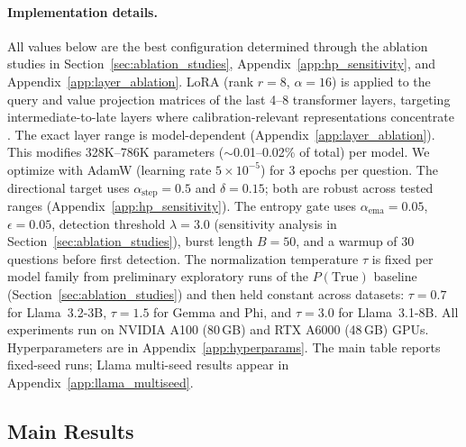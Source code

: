 \documentclass[11pt]{article}
\begin{document}
\paragraph{Implementation details.}
All values below are the best configuration determined through the ablation studies in Section~\ref{sec:ablation_studies}, Appendix~\ref{app:hp_sensitivity}, and Appendix~\ref{app:layer_ablation}.
LoRA (rank $r{=}8$, $\alpha{=}16$) is applied to the query and value projection matrices of the last 4--8 transformer layers, targeting intermediate-to-late layers where calibration-relevant representations concentrate \cite{du_haloscope_2024}. The exact layer range is model-dependent (Appendix~\ref{app:layer_ablation}). This modifies 328K--786K parameters (${\sim}$0.01--0.02\% of total) per model.
We optimize with AdamW (learning rate $5 \times 10^{-5}$) for 3 epochs per question. The directional target uses $\alpha_{\text{step}} = 0.5$ and $\delta = 0.15$; both are robust across tested ranges (Appendix~\ref{app:hp_sensitivity}).
The entropy gate uses $\alpha_{\text{ema}} = 0.05$, $\epsilon = 0.05$, detection threshold $\lambda = 3.0$ (sensitivity analysis in Section~\ref{sec:ablation_studies}), burst length $B = 50$, and a warmup of 30 questions before first detection.
The normalization temperature $\tau$ is fixed per model family from preliminary exploratory runs of the $P(\text{True})$ baseline (Section~\ref{sec:ablation_studies}) and then held constant across datasets: $\tau{=}0.7$ for Llama~3.2-3B, $\tau{=}1.5$ for Gemma and Phi, and $\tau{=}3.0$ for Llama~3.1-8B.
All experiments run on NVIDIA A100 (80\,GB) and RTX A6000 (48\,GB) GPUs.
Hyperparameters are in Appendix~\ref{app:hyperparams}. The main table reports fixed-seed runs; Llama multi-seed results appear in Appendix~\ref{app:llama_multiseed}.

\subsection{Main Results} \label{subsec:main_results}
\end{document}
